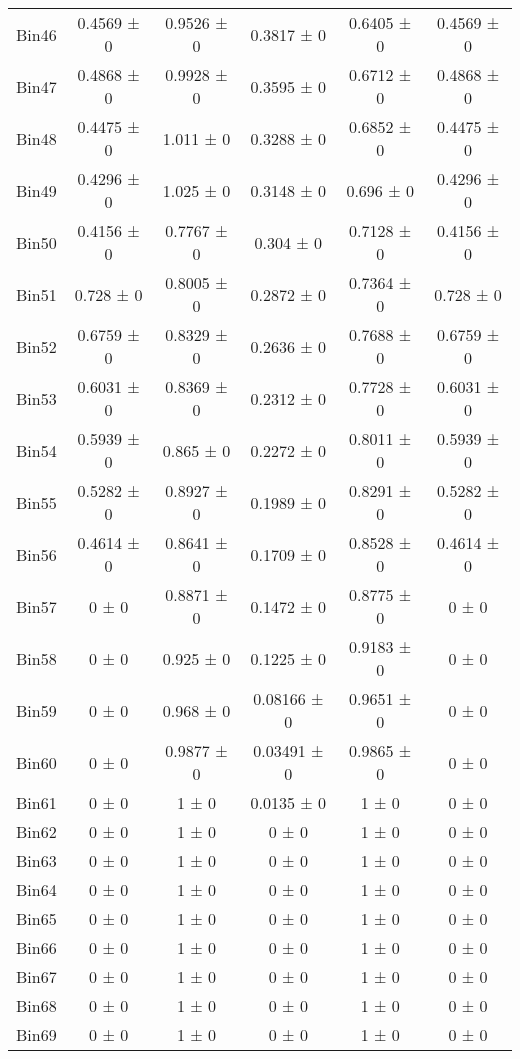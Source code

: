 \begin{tabular}{@{\extracolsep{4pt}}lccccc@{}}
     Bin46 & 0.4569 ± 0 & 0.9526 ± 0 & 0.3817 ± 0 & 0.6405 ± 0 & 0.4569 ± 0 \\ 
     Bin47 & 0.4868 ± 0 & 0.9928 ± 0 & 0.3595 ± 0 & 0.6712 ± 0 & 0.4868 ± 0 \\ 
     Bin48 & 0.4475 ± 0 & 1.011 ± 0 & 0.3288 ± 0 & 0.6852 ± 0 & 0.4475 ± 0 \\ 
     Bin49 & 0.4296 ± 0 & 1.025 ± 0 & 0.3148 ± 0 & 0.696 ± 0 & 0.4296 ± 0 \\ 
     Bin50 & 0.4156 ± 0 & 0.7767 ± 0 & 0.304 ± 0 & 0.7128 ± 0 & 0.4156 ± 0 \\ 
     Bin51 & 0.728 ± 0 & 0.8005 ± 0 & 0.2872 ± 0 & 0.7364 ± 0 & 0.728 ± 0 \\ 
     Bin52 & 0.6759 ± 0 & 0.8329 ± 0 & 0.2636 ± 0 & 0.7688 ± 0 & 0.6759 ± 0 \\ 
     Bin53 & 0.6031 ± 0 & 0.8369 ± 0 & 0.2312 ± 0 & 0.7728 ± 0 & 0.6031 ± 0 \\ 
     Bin54 & 0.5939 ± 0 & 0.865 ± 0 & 0.2272 ± 0 & 0.8011 ± 0 & 0.5939 ± 0 \\ 
     Bin55 & 0.5282 ± 0 & 0.8927 ± 0 & 0.1989 ± 0 & 0.8291 ± 0 & 0.5282 ± 0 \\ 
     Bin56 & 0.4614 ± 0 & 0.8641 ± 0 & 0.1709 ± 0 & 0.8528 ± 0 & 0.4614 ± 0 \\ 
     Bin57 & 0 ± 0 & 0.8871 ± 0 & 0.1472 ± 0 & 0.8775 ± 0 & 0 ± 0 \\ 
     Bin58 & 0 ± 0 & 0.925 ± 0 & 0.1225 ± 0 & 0.9183 ± 0 & 0 ± 0 \\ 
     Bin59 & 0 ± 0 & 0.968 ± 0 & 0.08166 ± 0 & 0.9651 ± 0 & 0 ± 0 \\ 
     Bin60 & 0 ± 0 & 0.9877 ± 0 & 0.03491 ± 0 & 0.9865 ± 0 & 0 ± 0 \\ 
     Bin61 & 0 ± 0 & 1 ± 0 & 0.0135 ± 0 & 1 ± 0 & 0 ± 0 \\ 
     Bin62 & 0 ± 0 & 1 ± 0 & 0 ± 0 & 1 ± 0 & 0 ± 0 \\ 
     Bin63 & 0 ± 0 & 1 ± 0 & 0 ± 0 & 1 ± 0 & 0 ± 0 \\ 
     Bin64 & 0 ± 0 & 1 ± 0 & 0 ± 0 & 1 ± 0 & 0 ± 0 \\ 
     Bin65 & 0 ± 0 & 1 ± 0 & 0 ± 0 & 1 ± 0 & 0 ± 0 \\ 
     Bin66 & 0 ± 0 & 1 ± 0 & 0 ± 0 & 1 ± 0 & 0 ± 0 \\ 
     Bin67 & 0 ± 0 & 1 ± 0 & 0 ± 0 & 1 ± 0 & 0 ± 0 \\ 
     Bin68 & 0 ± 0 & 1 ± 0 & 0 ± 0 & 1 ± 0 & 0 ± 0 \\ 
     Bin69 & 0 ± 0 & 1 ± 0 & 0 ± 0 & 1 ± 0 & 0 ± 0 \\ 

\end{tabular}
